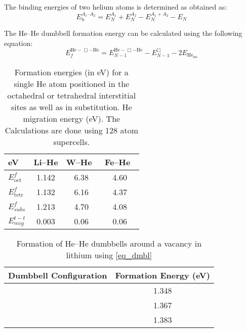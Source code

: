 The binding energies of two helium atoms is determined as obtained as:
\begin{equation}
E_{\text{b}}^{A_1\text{--}A_2} = E_N^{A_1} + E_N^{A_2} - E_N^{A_1+A_2} - E_N 
\end{equation}

The He--He dumbbell formation energy can be calculated using the following equation:
\begin{equation}\label{eq_dmbl}
E_{f}^{\text{He}-\Box-\text{He}} = E_{N-1}^{\text{He}-\Box-\text{He}} - E_{N-1}^{\Box} - 2E_{\text{He}_{\text{iso}}}
\end{equation}

\begin{table}
\caption[]{Formation energies (in eV) for a single He atom positioned in the octahedral or tetrahedral interstitial sites as well as in substitution. He migration energy (eV). The Calculations are done using 128 atom supercells.}
\label{table:he_li}
\centering
\begin{tabular}{l|c|c|c} \hline \hline
eV                & Li--He  &  W--He~\cite{becquart2007ab}   &  Fe--He~\cite{seletskaia2005magnetic} \\ \hline
    $E^{f}_{\text{oct}}$  & 1.142   &  6.38    & 4.60   \\ \hline
    $E^{f}_{\text{tetr}}$ & 1.132   &  6.16    & 4.37   \\ \hline
    $E^f_{subs}$          & 1.213   &  4.70    & 4.08   \\ \hline
    $E^{t-t}_{mig}$       & 0.003   &  0.06    & 0.06    \\ \hline 
\end{tabular}
\end{table}

\begin{table}
\caption[]{Formation of  He--He dumbbells around a vacancy in lithium using \eqref{eq_dmbl}}
\label{table:dumbel}
\centering
\begin{tabular}{c|c} \hline \hline
Dumbbell Configuration & Formation Energy (eV) \\ \hline 
{}	& 1.348 \\ \hline
{}   & 1.367  \\ \hline
{}   & 1.383 \\ \hline
\end{tabular}
\end{table}




